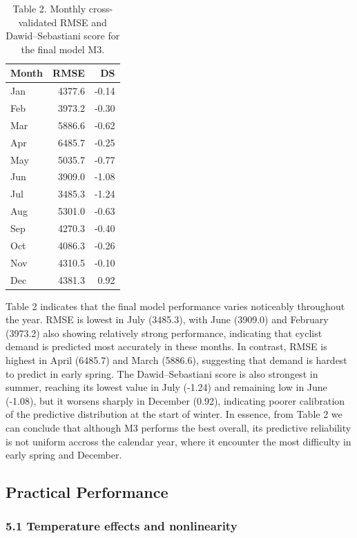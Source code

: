 \documentclass[
]{article}
\begin{document}
\begin{table}[!h]
\centering
\caption{\label{tab:unnamed-chunk-4}Table 2. Monthly cross-validated RMSE and Dawid--Sebastiani score for the final model M3.}
\centering
\begin{tabular}[t]{lrr}
\toprule
Month & RMSE & DS\\
\midrule
Jan & 4377.6 & -0.14\\
Feb & 3973.2 & -0.30\\
Mar & 5886.6 & -0.62\\
Apr & 6485.7 & -0.25\\
May & 5035.7 & -0.77\\
\addlinespace
Jun & 3909.0 & -1.08\\
Jul & 3485.3 & -1.24\\
Aug & 5301.0 & -0.63\\
Sep & 4270.3 & -0.40\\
Oct & 4086.3 & -0.26\\
\addlinespace
Nov & 4310.5 & -0.10\\
Dec & 4381.3 & 0.92\\
\bottomrule
\end{tabular}
\end{table}

Table 2 indicates that the final model performance varies noticeably
throughout the year. RMSE is lowest in July (3485.3), with June (3909.0)
and February (3973.2) also showing relatively strong performance,
indicating that cyclist demand is predicted most accurately in these
months. In contrast, RMSE is highest in April (6485.7) and March
(5886.6), suggesting that demand is hardest to predict in early spring.
The Dawid--Sebastiani score is also strongest in summer, reaching its
lowest value in July (-1.24) and remaining low in June (-1.08), but it
worsens sharply in December (0.92), indicating poorer calibration of the
predictive distribution at the start of winter. In essence, from Table 2
we can conclude that although M3 performs the best overall, its
predictive reliability is not uniform accross the calendar year, where
it encounter the most difficulty in early spring and December.

\subsection{Practical Performance}\label{practical-performance}

\subsubsection{5.1 Temperature effects and
nonlinearity}\label{temperature-effects-and-nonlinearity}
\end{document}
